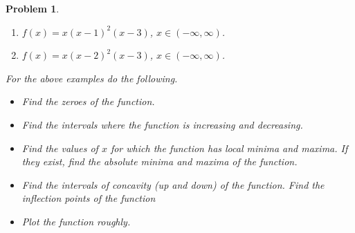 \documentclass{article}
\newtheorem{problem}{Problem}
\begin{document}
\begin{problem}~

\begin{enumerate}
\item $f(x)=x(x-1)^2(x-3)$, $x\in(-\infty, \infty) $.
\item $f(x)=x(x-2)^2(x-3)$, $x\in(-\infty, \infty) $.
\end{enumerate}
For the above examples do the following.
\begin{itemize}
\item Find the zeroes of the function.
\item Find the intervals where the function is increasing and decreasing. 
\item Find the values of $x$ for which the function has local minima and maxima. If they exist, find the absolute minima and maxima of the function.
\item Find the intervals of concavity (up and down)  of the function. Find the inflection points of the function
\item Plot the function roughly. 

\end{itemize}
\end{problem}
\end{document}
